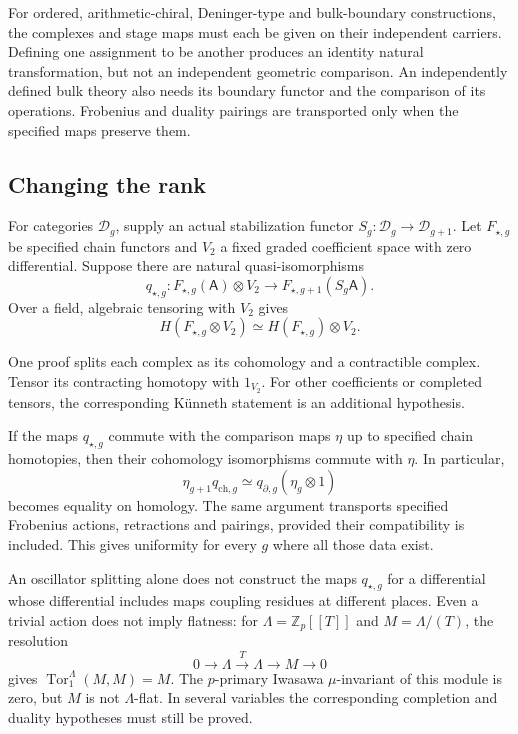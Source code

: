 For ordered, arithmetic-chiral, Deninger-type and bulk-boundary
constructions, the complexes and stage maps must each be given on their
independent carriers. Defining one assignment to be another produces an
identity natural transformation, but not an independent geometric
comparison. An independently defined bulk theory also needs its boundary
functor and the comparison of its operations. Frobenius and duality pairings
are transported only when the specified maps preserve them.

\subsection{Changing the rank}

For categories $\mathcal D_g$, supply an actual stabilization functor
$S_g:\mathcal D_g\to \mathcal D_{g+1}$. Let $F_{\star,g}$ be specified chain
functors and $V_2$ a fixed graded coefficient space with zero differential.
Suppose there are natural quasi-isomorphisms
\[
 q_{\star,g}:F_{\star,g}(\mathsf A)\otimes V_2
       \longrightarrow
       F_{\star,g+1}(S_g\mathsf A).
\]
Over a field, algebraic tensoring with $V_2$ gives
\[
 H(F_{\star,g}\otimes V_2)
     \simeq H(F_{\star,g})\otimes V_2.
\]

One proof splits each complex as its cohomology and a contractible complex.
Tensor its contracting homotopy with $1_{V_2}$. For other coefficients or
completed tensors, the corresponding K\"unneth statement is an additional
hypothesis.

If the maps $q_{\star,g}$ commute with the comparison maps $\eta$ up to
specified chain homotopies, then their cohomology isomorphisms commute with
$\eta$. In particular,
\[
 \eta_{g+1}q_{\mathrm{ch},g}
   \simeq q_{\partial,g}(\eta_g\otimes1)
\]
becomes equality on homology. The same argument transports specified
Frobenius actions, retractions and pairings, provided their compatibility is
included. This gives uniformity for every $g$ where all those data exist.

An oscillator splitting alone does not construct the maps $q_{\star,g}$ for
a differential whose differential includes maps coupling residues at different places. Even a trivial action does
not imply flatness: for $\Lambda=\mathbb Z_p[[T]]$ and $M=\Lambda/(T)$, the
resolution
\[
 0\longrightarrow\Lambda
   \xrightarrow{T}\Lambda
   \longrightarrow M\longrightarrow0
\]
gives $\operatorname{Tor}_1^\Lambda(M,M)=M$. The $p$-primary Iwasawa
$\mu$-invariant of this module is zero, but $M$ is not $\Lambda$-flat. In
several variables the corresponding completion and duality hypotheses must
still be proved.

